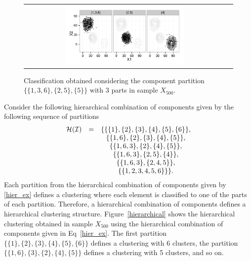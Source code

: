 \documentclass[10pt, a4paper]{article}
\begin{document}
\begin{figure}[!h]
\begin{center}
\begin{tabular}{cc}
  \includegraphics[trim=0cm 0cm 0cm 0cm,width=0.6\textwidth]{partition-example-part3a.pdf} \\
 \end{tabular}
 \caption{Classification obtained considering the component partition $\{\{1, 3, 6 \}, \{2, 5\}, \{5\}\}$ with 3 parts in sample $X_{500}$.}\label{ex_part3a}
\end{center}
\end{figure}

Consider the following hierarchical combination of components given by the following sequence of partitions
\begin{equation}
\begin{array}{r c c}
\mathcal{H}(\mathcal{I}) &=& \{ \{\{1\},\{2\},\{3\},\{4\},\{5\},\{6\}\}, \\
   & & \{\{1, 6\},\{2\},\{3\},\{4\},\{5\} \}, \\
   & &    \{\{1, 6, 3\},\{2\},\{4\},\{5\} \}, \\
   & &    \{\{1, 6, 3\},\{2, 5\},\{4 \} \}, \\
    & &   \{\{1, 6, 3\},\{2, 4, 5\} \}, \\
   & &    \{\{1, 2, 3, 4, 5, 6\}\} \}.
\end{array}
\label{hier_ex}
\end{equation}
Each partition from the hierarchical combination of components given by \ref{hier_ex} defines a clustering where each element is classified to one of the parts of each partition. Therefore, a hierarchical combination of components defines a hierarchical clustering structure. Figure~\ref{hierarchical} shows the hierarchical clustering obtained in sample $X_{500}$ using the hierarchical combination of components given in Eq~\ref{hier_ex}. The first partition $\{\{1\},\{2\},\{3\},\{4\},\{5\},\{6\}\}$ defines a clustering with 6 clusters, the partition $\{\{1, 6\}, \{3\},\{2\},\{4\},\{5\} \}$ defines a clustering with 5 clusters, and so on.
\end{document}
